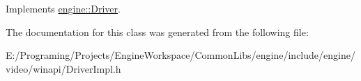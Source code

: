Implements \hyperlink{a00024}{engine\+::\+Driver}.



The documentation for this class was generated from the following file\+:\begin{DoxyCompactItemize}
\item 
E\+:/\+Programing/\+Projects/\+Engine\+Workspace/\+Common\+Libs/engine/include/engine/video/winapi/Driver\+Impl.\+h\end{DoxyCompactItemize}
